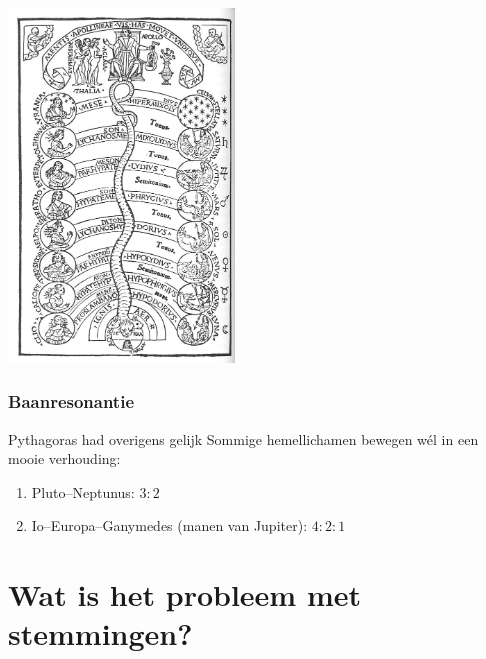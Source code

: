 \documentclass[compress, darktitle, framenumber, totalframenumber]{beamer}
\newenvironment{danger}{\medbreak\noindent\hangindent=2pc\hangafter=-2%
  \clubpenalty=10000%
  \hbox to0pt{\hskip-\hangindent\dbend\hfill}\small\ignorespaces}%
  {\medbreak\par}
\begin{document}
\begin{frame}[plain]
  \centering
  \includegraphics[width=6cm]{images/spheres}
\end{frame}

\begin{frame}
  \frametitle{Baanresonantie}

  \begin{block}{Pythagoras had overigens gelijk}
    Sommige hemellichamen bewegen w\'el in een mooie verhouding:
    \begin{enumerate}
      \item Pluto--Neptunus: $3:2$
      \item Io--Europa--Ganymedes (manen van Jupiter): $4:2:1$
    \end{enumerate}
  \end{block}

  \pause

\end{frame}

\section{Wat is het probleem met stemmingen?}
\end{document}
